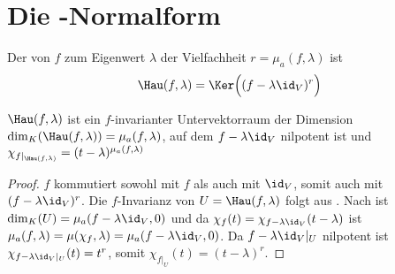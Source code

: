 \section{Die -Normalform}

\begin{definition}[Hauptraum]
	Der  von $f$ zum Eigenwert $\lambda$ der Vielfachheit $r=\mu_a(f,\lambda)$ ist
	\begin{align}
		\Hau(f,\lambda)=\Ker\Big( (f-\lambda\id_V)^r\Big) \notag
	\end{align}
\end{definition}

\begin{lemma}
	$\Hau(f,\lambda)$ ist ein $f$-invarianter Untervektorraum der Dimension $\dim_K(\Hau(f,\lambda))= \mu_a(f,\lambda)$, auf dem $f-\lambda\id_V$ nilpotent ist und $\chi_{f\vert_{\Hau(f,\lambda)}}= (t-\lambda)^{\mu_a(f,\lambda)}$
\end{lemma}
\begin{proof}
	$f$ kommutiert sowohl mit $f$ als auch mit $\id_V$, somit auch mit $(f-\lambda\id_V)^r$. Die $f$-Invarianz von $U=\Hau(f,\lambda)$ folgt aus . Nach  ist $\dim_K(U)=\mu_a(f-\lambda\id_V,0)$ und da $\chi_f(t)=\chi_{f-\lambda\id_V}(t-\lambda)$ ist $\mu_a(f,\lambda)=\mu(\chi_f,\lambda)= \mu_a(f-\lambda\id_V,0)$. Da $f-\lambda\id_V\vert_U$ nilpotent ist $\chi_{f-\lambda\id_V\vert_U}(t)= t^r$, somit $\chi_{f\vert_U}(t)=(t-\lambda)^r$.
\end{proof}

